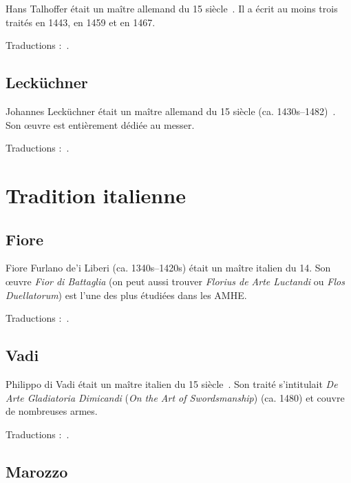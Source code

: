 Hans Talhoffer était un maître allemand du 15\ieme{} siècle~\cite{wiktenauer:talhoffer}.
Il a écrit au moins trois traités en 1443, en 1459 et en 1467.

Traductions :~\cite{gaurin:talhoffer:2005}.


\subsection{Lecküchner}
\label{app:maitres:lekuchner}

Johannes Lecküchner était un maître allemand du 15\ieme{} siècle (ca. 1430s–1482)~\cite{wiktenauer:leckuchner}.
Son œuvre est entièrement dédiée au messer.


Traductions :~\cite{ardamhe:leckuchner}.


\section{Tradition italienne}



\subsection{Fiore}
\label{app:maitres:fiore}

Fiore Furlano de'i Liberi (ca. 1340s–1420s) était un maître italien du 14\ieme{}.
Son œuvre \emph{Fior di Battaglia} (on peut aussi trouver \emph{Florius de Arte Luctandi} ou \emph{Flos Duellatorum}) est l'une des plus étudiées dans les AMHE.

Traductions :~\cite{deiLiberi:Conan:2014:FleurCombat, exiles:fiore:getty}.


\subsection{Vadi}
\label{app:maitres:vadi}

Philippo di Vadi était un maître italien du 15\ieme{} siècle~\cite{wiktenauer:vadi}.
Son traité s'intitulait \emph{De Arte Gladiatoria Dimicandi} (\emph{On the Art of Swordsmanship}) (ca. 1480) et couvre de nombreuses armes.

Traductions :~\cite{Vadi:Chaize:2007:ArtCombat, Vadi:Patrouix:2013:LartCombattreSpadassin, Vadi:Petit:2013:EpeeLongue}.


\subsection{Marozzo}
\label{app:maitres:marozzo}

